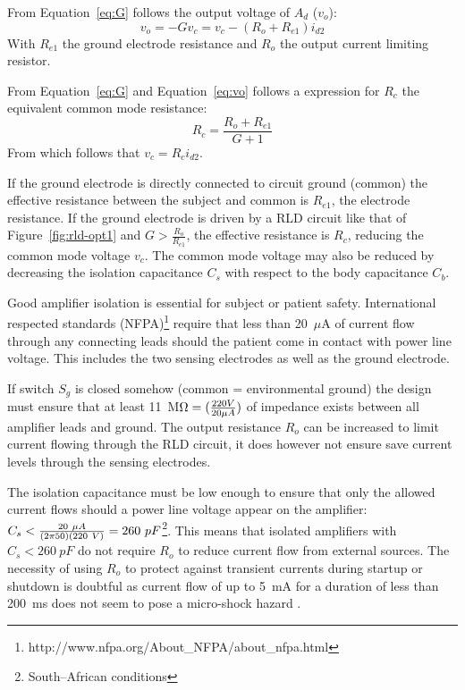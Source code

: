 From Equation~\ref{eq:G} follows the output voltage of $A_d$ ($v_o$):
\begin{equation}
	v_o = -Gv_c = v_c - (R_o + R_{e1})i_{d2}
	\label{eq:vo}
\end{equation}
With $R_{e1}$ the ground electrode resistance and $R_o$ the output
current limiting resistor.

From Equation~\ref{eq:G} and Equation~\ref{eq:vo} follows a expression
for $R_c$ the equivalent common mode resistance:
\begin{equation}
	R_c = \frac{R_o + R_{e1}}{G + 1}
	\label{eq:rc}
\end{equation}
From which follows that $v_c = R_ci_{d2}$.

If the ground electrode is directly connected to circuit ground
(common) the effective resistance between the subject and common is
$R_{e1}$, the electrode resistance. If the ground electrode is driven
by a RLD circuit like that of Figure~\ref{fig:rld-opt1} and $G >
\frac{R_o}{R_{e1}}$, the effective resistance is $R_c$, reducing the
common mode voltage $v_c$. The common mode voltage may also be reduced
by decreasing the isolation capacitance $C_s$ with respect to the body
capacitance $C_b$.


Good amplifier isolation is essential for subject or patient
safety. International respected standards
(NFPA)\footnote{http://www.nfpa.org/About\_NFPA/about\_nfpa.html}
require that less than 20~$\mu$A of current flow through any connecting
leads should the patient come in contact with power line voltage. This
includes the two sensing electrodes as well as the ground electrode.

If switch $S_g$ is closed somehow (common = environmental ground) the
design must ensure that at least 11~M$\Omega = (\frac{220V}{20\mu\/A})$
of impedance exists between all amplifier leads and ground. The output
resistance $R_o$ can be increased to limit current flowing through the
RLD circuit, it does however not ensure save current levels through
the sensing electrodes.

The isolation capacitance must be low enough to ensure that only the
allowed current flows should a power line voltage appear on the
amplifier: $C_s < \frac{20~\mu\/A}{(2\pi\/50)(220~V)} =
260~pF$\footnote{South--African conditions}. This means that isolated
amplifiers with $C_s < 260~pF$ do not require $R_o$ to reduce current
flow from external sources. The necessity of using $R_o$ to protect
against transient currents during startup or shutdown is doubtful as
current flow of up to 5~mA for a duration of less than 200~ms does not
seem to pose a micro-shock hazard \cite{drive}.


